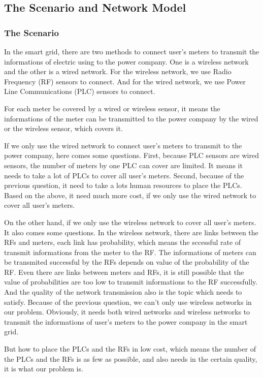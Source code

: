 \documentclass[conference]{IEEEtran}
\theoremstyle{definition}
\begin{document}
\subsection{The Scenario and Network Model}\label{subsec:scenario}
\subsubsection{The Scenario}
In the smart grid, there are two methods to connect user's meters to transmit the informations of electric using to the power company. One is a wireless network and the other is a wired network. For the wireless network, we use Radio Frequency (RF) sensors to connect. And for the wired network, we use Power Line Communications (PLC) sensors to connect. 
\par For each meter be covered by a wired or wireless sensor, it means the informations of the meter can be transmitted to the power company by the wired or the wireless sensor, which covers it.	
\par If we only use the wired network to connect user's meters to transmit to the power company, here comes some questions. First, because PLC sensors are wired sensors, the number of meters by one PLC can cover are limited. It means it needs to take a lot of PLCs to cover all user's meters. Second, because of the previous question, it need to take a lots human resources to place the PLCs. Based on the above, it need much more cost, if we only use the wired network to cover all user's meters. 
\par On the other hand, if we only use the wireless network to cover all user's meters. It also comes some questions. In the wireless network, there are links between the RFs and meters, each link has probability, which means the sccessful rate of transmit informations from the meter to the RF. The informations of meters can be transmited successful by the RFs depends on value of the probability of the RF. Even there are links between meters and RFs, it is still possible that the value of probabilities are too low to transmit informations to the RF successfully. And the quality of the network transmission also is the topic which needs to satisfy. Because of the previous question, we can't only use wireless networks in our problem. Obviously, it needs both wired networks and wireless networks to transmit the informations of user's meters to the power company in the smart grid. 
\par But how to place the PLCs and the RFs in low cost, which means the number of the PLCs and the RFs is as few as possible, and also needs in the certain quality, it is what our problem is. 
\end{document}
